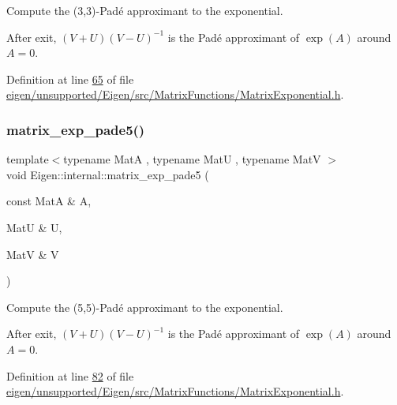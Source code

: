 Compute the (3,3)-\/\+Pad\'{e} approximant to the exponential. 

After exit, $ (V+U)(V-U)^{-1} $ is the Pad\'{e} approximant of $ \exp(A) $ around $ A = 0 $. 

Definition at line \hyperlink{eigen_2unsupported_2_eigen_2src_2_matrix_functions_2_matrix_exponential_8h_source_l00065}{65} of file \hyperlink{eigen_2unsupported_2_eigen_2src_2_matrix_functions_2_matrix_exponential_8h_source}{eigen/unsupported/\+Eigen/src/\+Matrix\+Functions/\+Matrix\+Exponential.\+h}.

\mbox{\label{namespace_eigen_1_1internal_af4992d182490219270a24aaa8285e63a}} 
\subsubsection{\texorpdfstring{matrix\+\_\+exp\+\_\+pade5()}{matrix\_exp\_pade5()}}
{\footnotesize\ttfamily template$<$typename MatA , typename MatU , typename MatV $>$ \\
void Eigen\+::internal\+::matrix\+\_\+exp\+\_\+pade5 (\begin{DoxyParamCaption}\item[{const MatA \&}]{A,  }\item[{MatU \&}]{U,  }\item[{MatV \&}]{V }\end{DoxyParamCaption})}



Compute the (5,5)-\/\+Pad\'{e} approximant to the exponential. 

After exit, $ (V+U)(V-U)^{-1} $ is the Pad\'{e} approximant of $ \exp(A) $ around $ A = 0 $. 

Definition at line \hyperlink{eigen_2unsupported_2_eigen_2src_2_matrix_functions_2_matrix_exponential_8h_source_l00082}{82} of file \hyperlink{eigen_2unsupported_2_eigen_2src_2_matrix_functions_2_matrix_exponential_8h_source}{eigen/unsupported/\+Eigen/src/\+Matrix\+Functions/\+Matrix\+Exponential.\+h}.

\mbox{\label{namespace_eigen_1_1internal_a1abecb439e6cb1b5188828cdb7e0ab60}} 
